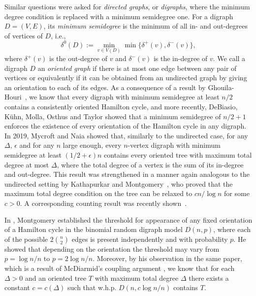 \documentclass[10pt, a4paper]{article}
\theoremstyle{remark}
\begin{document}
Similar questions were asked for \emph{directed graphs}, or \emph{digraphs}, where the minimum degree condition is replaced with a minimum semidegree one.
For a digraph $D = (V, E)$, its \emph{minimum semidegree} is the minimum of all in- and out-degrees of vertices of $D$, i.e.,
\[ \delta^0(D) := \min_{v\in V(D)} \min\{ \delta^+(v), \delta^-(v) \},\]
where $\delta^+(v)$ is the out-degree of $v$ and $\delta^-(v)$ is the in-degree of $v$.
We call a digraph $D$ an \emph{oriented graph} if there is at most one edge between any pair of vertices or equivalently if it can be obtained from an undirected graph by giving an orientation to each of its edges.
As a consequence of a result by Ghouila-Houri~\cite{ghouilahouri1960condition}, we know that every digraph with minimum semidegree at least $n/2$ contains a consistently oriented Hamilton cycle, and more recently, DeBiasio, Kühn, Molla, Osthus and Taylor \cite{debiasio_all_orientations} showed that a minimum semidegree of $n/2 + 1$\footnotemark enforces the existence of every orientation of the Hamilton cycle in any digraph.
In 2019, Mycroft and Naia \cite{mycroft_spanning_2019} showed that, similarly to the undirected case, for any $\Delta$, $\epsilon$ and for any $n$ large enough, every $n$-vertex digraph with minimum semidegree at least $(1/2 + \epsilon) n$ contains every oriented tree with maximum total degree at most $\Delta$, where the total degree of a vertex is the sum of its in-degree and out-degree. This result was strengthened in a manner again analogous to the undirected setting by Kathapurkar and Montgomery~\cite{kathapurkar22}, who proved that the maximum total degree condition on the tree can be relaxed to $cn/\log{n}$ for some $c>0$. A corresponding counting result was recently shown~\cite{joos2023counting}.


In \cite{montgomery_spanning_2021}, Montgomery established the threshold for appearance of any fixed orientation of a Hamilton cycle in the binomial random digraph model $D(n, p)$, where each of the possible $2\binom{n}{2}$ edges is present independently and with probability $p$.
He showed that depending on the orientation the threshold may vary from $p = \log n /n$ to $p = 2 \log n /n$.
Moreover, by his observation in the same paper, which is a result of McDiarmid's coupling argument \cite{mcdiarmid_general_1983}, we know that for each $\Delta > 0$ and an oriented tree $T$ with maximum total degree $\Delta$ there exists a constant $c = c(\Delta)$ such that w.h.p. $D(n, c \log n/ n)$ contains $T$.
\end{document}
